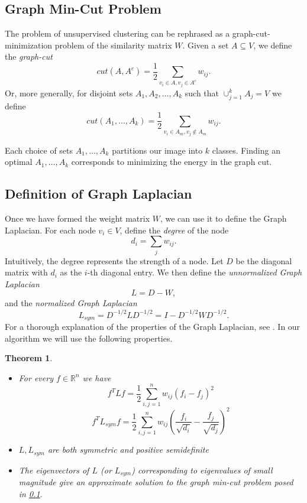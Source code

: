 \documentclass[12pt]{article}
\newtheorem{theorem}{Theorem}[section]
\begin{document}
\subsection{Graph Min-Cut Problem} \label{GraphMinCut}
The problem of unsupervised clustering can be rephrased as a graph-cut-minimization problem of the similarity matrix $W$. Given a set $A\subseteq V$, we define the \emph{graph-cut} \[cut(A,A^c) = \frac{1}{2}\sum_{v_i \in A, v_j \in A^c} w_{ij}.\] Or, more generally, for disjoint sets $A_1, A_2, \ldots, A_k$ such that $\cup_{j=1}^kA_j = V$ we define \[cut(A_1,\ldots,A_k) = \frac{1}{2}\sum_{v_{i} \in A_m, v_j \notin A_m}w_{ij}.\]

Each choice of sets $A_1,\ldots,A_k$ partitions our image into $k$ classes. Finding an optimal $A_1,\ldots,A_k$ corresponds to minimizing the energy in the graph cut.

\subsection{Definition of Graph Laplacian}

Once we have formed the weight matrix $W$, we can use it to define the Graph Laplacian. For each node $v_i\in V$, define the \emph{degree} of the node \[d_i = \sum_j w_{ij}.\] Intuitively, the degree represents the strength of a node. Let $D$ be the diagonal matrix with $d_i$ as the $i$-th diagonal entry. We then define the \emph{unnormalized Graph Laplacian} \[L = D - W,\] and the \emph{normalized Graph Laplacian} \[L_{sym} = D^{-1/2}LD^{-1/2} = I - D^{-1/2}WD^{-1/2}.\] For a thorough explanation of the properties of the Graph Laplacian, see \cite{ref:GraphLaplacian1}. In our algorithm we will use the following properties.

\begin{theorem}
\begin{itemize}
\item For every $f\in\mathbb{R}^n$ we have \[f^TLf = \frac{1}{2}\sum_{i,j=1}^nw_{ij}(f_i-f_j)^2\]
\[f^TL_{sym}f = \frac{1}{2}\sum_{i,j=1}^n w_{ij}\left(\frac{f_i}{\sqrt{d_i}}-\frac{f_j}{\sqrt{d_j}}\right)^2\] \label{GLiprod}
\item $L, L_{sym}$ are both symmetric and positive semidefinite
\item The eigenvectors of $L$ (or $L_{sym}$) corresponding to eigenvalues of small magnitude give an approximate solution to the graph min-cut problem posed in \ref{GraphMinCut}.
\end{itemize}
\end{theorem}
\end{document}
